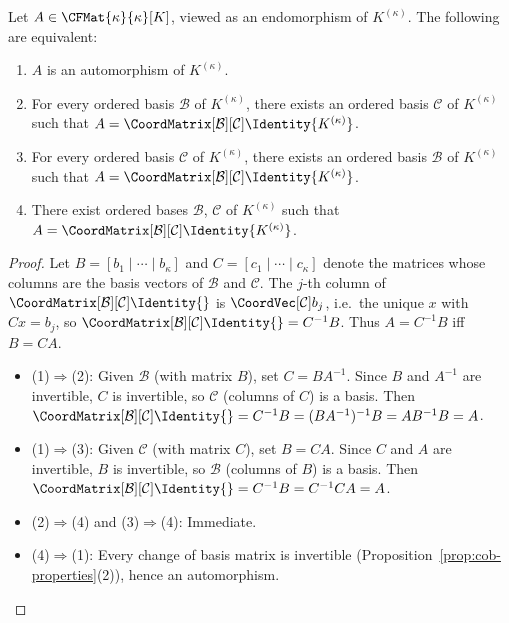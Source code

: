 \begin{corollary}
\label{cor:aut-cob}
    Let $A \in \CFMat{\kappa}{\kappa}[K]$, viewed as an endomorphism of $K^{(\kappa)}$.
    The following are equivalent:
    \begin{enumerate}
        \item $A$ is an automorphism of $K^{(\kappa)}$.
        \item For every ordered basis $\mathcal{B}$ of $K^{(\kappa)}$, there exists an ordered
              basis $\mathcal{C}$ of $K^{(\kappa)}$ such that
              $A = \CoordMatrix[\mathcal{B}][\mathcal{C}]{\Identity{K^{(\kappa)}}}$.
        \item For every ordered basis $\mathcal{C}$ of $K^{(\kappa)}$, there exists an ordered
              basis $\mathcal{B}$ of $K^{(\kappa)}$ such that
              $A = \CoordMatrix[\mathcal{B}][\mathcal{C}]{\Identity{K^{(\kappa)}}}$.
        \item There exist ordered bases $\mathcal{B}$, $\mathcal{C}$ of $K^{(\kappa)}$ such
              that $A = \CoordMatrix[\mathcal{B}][\mathcal{C}]{\Identity{K^{(\kappa)}}}$.
    \end{enumerate}
\end{corollary}

\begin{proof}
    Let $B = [b_1 \mid \cdots \mid b_\kappa]$ and $C = [c_1 \mid \cdots \mid c_\kappa]$
    denote the matrices whose columns are the basis vectors of $\mathcal{B}$ and
    $\mathcal{C}$. The $j$-th column of
    $\CoordMatrix[\mathcal{B}][\mathcal{C}]{\Identity{}}$ is $\CoordVec[\mathcal{C}]{b_j}$,
    i.e.\ the unique $x$ with $Cx = b_j$, so
    $\CoordMatrix[\mathcal{B}][\mathcal{C}]{\Identity{}} = C^{-1}B$.
    Thus $A = C^{-1}B$ iff $B = CA$.

    \begin{itemize}
        \item (1)$\Rightarrow$(2): Given $\mathcal{B}$ (with matrix $B$), set $C = BA^{-1}$.
              Since $B$ and $A^{-1}$ are invertible, $C$ is invertible, so $\mathcal{C}$
              (columns of $C$) is a basis. Then
              $\CoordMatrix[\mathcal{B}][\mathcal{C}]{\Identity{}} = C^{-1}B
              = (BA^{-1})^{-1}B = AB^{-1}B = A$.

        \item (1)$\Rightarrow$(3): Given $\mathcal{C}$ (with matrix $C$), set $B = CA$.
              Since $C$ and $A$ are invertible, $B$ is invertible, so $\mathcal{B}$
              (columns of $B$) is a basis. Then
              $\CoordMatrix[\mathcal{B}][\mathcal{C}]{\Identity{}} = C^{-1}B = C^{-1}CA = A$.

        \item (2)$\Rightarrow$(4) and (3)$\Rightarrow$(4): Immediate.

        \item (4)$\Rightarrow$(1): Every change of basis matrix is invertible
              (Proposition~\ref{prop:cob-properties}(2)), hence an automorphism. \qedhere
    \end{itemize}
\end{proof}

